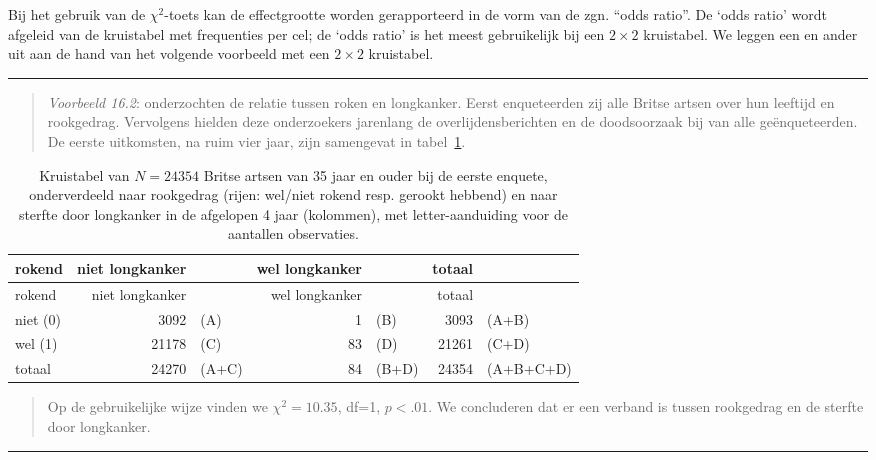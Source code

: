 \documentclass[
]{book}
\begin{document}
Bij het gebruik van de \(\chi^2\)-toets kan de effectgrootte worden gerapporteerd in de
vorm van de zgn. ``odds ratio''. De `odds ratio' wordt afgeleid van de
kruistabel met frequenties per cel; de `odds ratio' is het meest gebruikelijk bij een \(2\times2\) kruistabel.
We leggen een en ander uit aan de hand van het volgende voorbeeld met een \(2\times2\) kruistabel.

\begin{center}\rule{0.5\linewidth}{0.5pt}\end{center}

\begin{quote}
\emph{Voorbeeld 16.2}:
\citet{DollHill1956} onderzochten de relatie tussen roken en
longkanker. Eerst enqueteerden zij alle Britse artsen over hun leeftijd
en rookgedrag. Vervolgens hielden deze onderzoekers jarenlang de
overlijdensberichten en de doodsoorzaak bij van alle geënqueteerden. De
eerste uitkomsten, na ruim vier jaar, zijn samengevat in
tabel~\ref{tab:dollhill}.
\end{quote}

\begin{longtable}[]{@{}lrlrlrl@{}}
\caption{\label{tab:dollhill} Kruistabel van \(N=24354\) Britse artsen van 35 jaar en ouder bij de eerste enquete, onderverdeeld naar rookgedrag (rijen: wel/niet rokend resp. gerookt hebbend) en naar sterfte door longkanker in de afgelopen 4 jaar (kolommen), met letter-aanduiding voor de aantallen observaties.}\tabularnewline
\toprule\noalign{}
rokend & niet longkanker & & wel longkanker & & totaal & \\
\midrule\noalign{}
\endfirsthead
\toprule\noalign{}
rokend & niet longkanker & & wel longkanker & & totaal & \\
\midrule\noalign{}
\endhead
\bottomrule\noalign{}
\endlastfoot
niet (0) & 3092 & (A) & 1 & (B) & 3093 & (A+B) \\
wel (1) & 21178 & (C) & 83 & (D) & 21261 & (C+D) \\
totaal & 24270 & (A+C) & 84 & (B+D) & 24354 & (A+B+C+D) \\
\end{longtable}

\begin{quote}
Op de gebruikelijke wijze vinden we \(\chi^2=10.35\), df=1, \(p<.01\). We
concluderen dat er een verband is tussen rookgedrag en de sterfte door
longkanker.
\end{quote}

\begin{center}\rule{0.5\linewidth}{0.5pt}\end{center}
\end{document}
